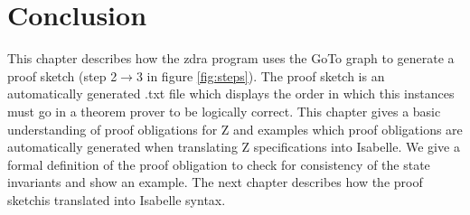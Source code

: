 \section{Conclusion}
\label{sec:skeletonsConclusion}

This chapter describes how the \gls{zdra} program uses the GoTo graph to
generate a proof sketch (step 2$\rightarrow$3 in figure
\ref{fig:steps}). The proof sketch is an automatically generated .txt
file which displays the order in which this instances must go in a theorem
prover to be logically correct. This chapter gives a basic understanding of
proof obligations for Z and examples which proof obligations are automatically
generated when translating Z specifications into Isabelle. We give a formal
definition of the proof obligation to check for consistency of the state
invariants and show an example. The next chapter describes how the proof
sketchis translated into Isabelle syntax.
